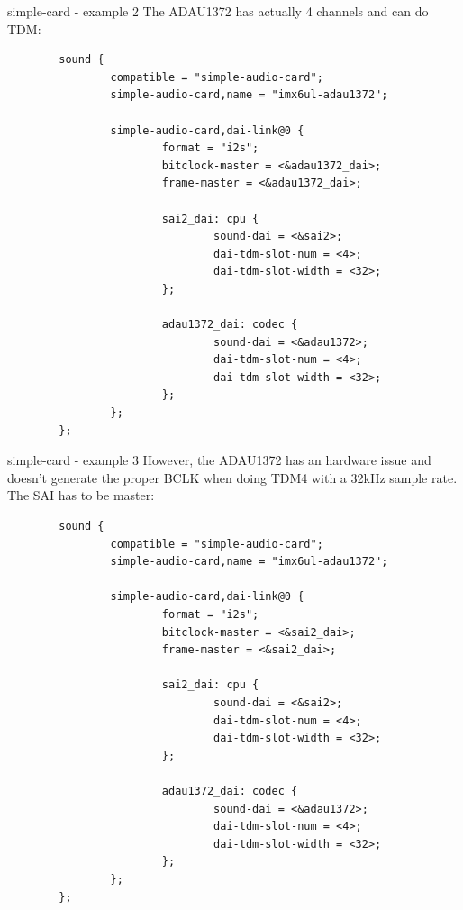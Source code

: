 \begin{frame}[fragile]{simple-card - example 2}
  The ADAU1372 has actually 4 channels and can do TDM:
  \begin{block}{}
    \fontsize{7}{6}\selectfont
    \begin{verbatim}
        sound {
                compatible = "simple-audio-card";
                simple-audio-card,name = "imx6ul-adau1372";

                simple-audio-card,dai-link@0 {
                        format = "i2s";
                        bitclock-master = <&adau1372_dai>;
                        frame-master = <&adau1372_dai>;

                        sai2_dai: cpu {
                                sound-dai = <&sai2>;
                                dai-tdm-slot-num = <4>;
                                dai-tdm-slot-width = <32>;
                        };

                        adau1372_dai: codec {
                                sound-dai = <&adau1372>;
                                dai-tdm-slot-num = <4>;
                                dai-tdm-slot-width = <32>;
                        };
                };
        };
    \end{verbatim}
  \end{block}
\end{frame}

\begin{frame}[fragile]{simple-card - example 3}
  However, the ADAU1372 has an hardware issue and doesn't generate the
  proper BCLK when doing TDM4 with a 32kHz sample rate. The SAI has to
  be master:
  \begin{block}{}
    \fontsize{7}{6}\selectfont
    \begin{verbatim}
        sound {
                compatible = "simple-audio-card";
                simple-audio-card,name = "imx6ul-adau1372";

                simple-audio-card,dai-link@0 {
                        format = "i2s";
                        bitclock-master = <&sai2_dai>;
                        frame-master = <&sai2_dai>;

                        sai2_dai: cpu {
                                sound-dai = <&sai2>;
                                dai-tdm-slot-num = <4>;
                                dai-tdm-slot-width = <32>;
                        };

                        adau1372_dai: codec {
                                sound-dai = <&adau1372>;
                                dai-tdm-slot-num = <4>;
                                dai-tdm-slot-width = <32>;
                        };
                };
        };
    \end{verbatim}
  \end{block}
\end{frame}

